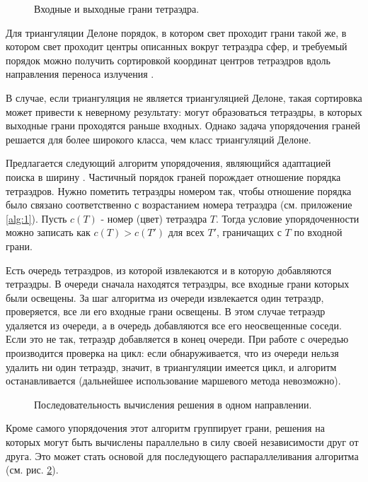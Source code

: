 \begin{figure}[ht!]
\caption{Входные и выходные грани тетраэдра.}
\label{fig:4}
\end{figure}

Для триангуляции Делоне порядок, в котором свет проходит грани такой же, в котором свет проходит центры описанных вокруг тетраэдра сфер, и требуемый порядок можно получить сортировкой координат центров тетраэдров вдоль направления переноса излучения \cite{skalko_2014}.

В случае, если триангуляция не является триангуляцией Делоне, такая сортировка может привести к неверному результату: могут образоваться тетраэдры, в которых выходные грани проходятся раньше входных. Однако задача упорядочения граней решается для более широкого класса, чем класс триангуляций Делоне. 

Предлагается следующий алгоритм упорядочения, являющийся адаптацией поиска в ширину \cite{corm_2009}. Частичный порядок граней порождает отношение порядка тетраэдров. Нужно пометить тетраэдры номером так, чтобы отношение порядка было связано соответственно с возрастанием номера тетраэдра (см. приложение \ref{alg:1}). Пусть $c(T)$ - номер (цвет) тетраэдра $T$. Тогда условие упорядоченности можно записать как $ c(T) > c (T')$ для всех $T'$, граничащих с $T$ по входной грани.

Есть очередь тетраэдров, из которой извлекаются и в которую добавляются тетраэдры. В очереди сначала находятся тетраэдры, все входные грани которых были освещены. За шаг алгоритма из очереди извлекается один тетраэдр, проверяется, все ли его входные грани освещены. В этом случае тетраэдр удаляется из очереди, а в очередь добавляются все его неосвещенные соседи. Если это не так, тетраэдр добавляется в конец очереди. При работе с очередью производится проверка на цикл: если обнаруживается, что из очереди нельзя удалить ни один тетраэдр, значит, в триангуляции имеется цикл, и алгоритм останавливается (дальнейшее использование маршевого метода невозможно).

\begin{figure}[ht!]
\caption{Последовательность вычисления решения в одном направлении.}
\label{fig:13}
\end{figure} 

Кроме самого упорядочения этот алгоритм группирует грани, решения на которых могут быть вычислены параллельно в силу своей независимости друг от друга. Это может стать основой для последующего распараллеливания алгоритма (см. рис. \ref{fig:13}).
